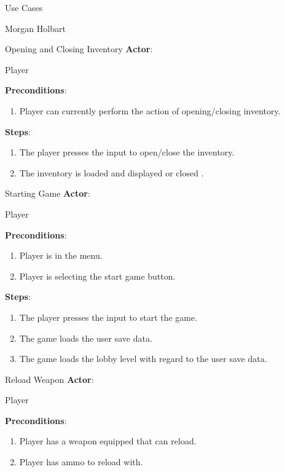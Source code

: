 \documentclass[12pt]{report}
\begin{document}
\begin{section}{Use Cases}
\begin{subsection}{Morgan Holbart}
\begin{subsubsection}{Opening and Closing Inventory}
\textbf{Actor}:

Player

\textbf{Preconditions}:
 
\begin{enumerate}
\item Player can currently perform the action of opening/closing inventory.
\end{enumerate}

\textbf{Steps}:

\begin{enumerate}
\item The player presses the input to open/close the inventory.
\item The inventory is loaded and displayed or closed .
\end{enumerate}
\end{subsubsection}

\begin{subsubsection}{Starting Game}
\textbf{Actor}:

Player

\textbf{Preconditions}:
 
\begin{enumerate}
\item Player is in the menu.
\item Player is selecting the start game button.
\end{enumerate}

\textbf{Steps}:

\begin{enumerate}
\item The player presses the input to start the game.
\item The game loads the user save data.
\item The game loads the lobby level with regard to the user save data.
\end{enumerate}
\end{subsubsection}

\begin{subsubsection}{Reload Weapon}
\textbf{Actor}:

Player

\textbf{Preconditions}:
 
\begin{enumerate}
\item Player has a weapon equipped that can reload.
\item Player has ammo to reload with.
\end{enumerate}


\end{subsubsection}
\end{subsection}
\end{section}
\end{document}
